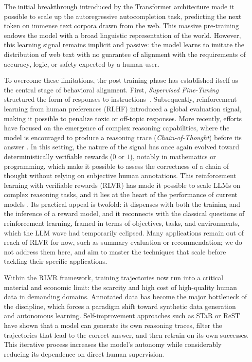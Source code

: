 \documentclass[11pt,a4paper]{article}
\begin{document}
The initial breakthrough introduced by the Transformer architecture \cite{vaswani2017attention} made it possible to scale up the autoregressive autocompletion task, predicting the next token on immense text corpora drawn from the web. This massive pre-training endows the model with a broad linguistic representation of the world. However, this learning signal remains implicit and passive: the model learns to imitate the distribution of web text with no guarantee of alignment with the requirements of accuracy, logic, or safety expected by a human user.

To overcome these limitations, the post-training phase has established itself as the central stage of behavioral alignment. First, \emph{Supervised Fine-Tuning} structured the form of responses to instructions~\cite{wei2022flan}. Subsequently, reinforcement learning from human preferences (RLHF) \cite{ouyang2022training} introduced a global evaluation signal, making it possible to penalize toxic or off-topic responses. More recently, efforts have focused on the emergence of complex reasoning capabilities, where the model is encouraged to produce a reasoning trace (\emph{Chain-of-Thought}) before its answer \cite{wei2022cot}. In this setting, the nature of the signal has once again evolved toward deterministically verifiable rewards ($0$ or $1$), notably in mathematics or programming, which make it possible to assess the correctness of a chain of thought without relying on subjective human annotations. This reinforcement learning with verifiable rewards (RLVR) has made it possible to scale LLMs on complex reasoning tasks, and it lies at the heart of the performance of current models \cite{openai_o1_2024, deepseekr1_2025}. Its practical appeal is twofold: it dispenses with both the training and the inference of a reward model, and it reconnects with the classical questions of reinforcement learning, framed in terms of objectives, tasks, and environments, which the LLM wave had temporarily eclipsed. Many applications remain out of reach of RLVR for now, such as summary evaluation or recommendation; we do not address them here, and aim to master the techniques that scale before tackling their specific applications.

Within the RLVR framework, training trajectories now run into a critical material and economic limit: the scarcity and high cost of high-quality human data in demanding domains. Annotated data has become the major bottleneck of the discipline, which forces a paradigm shift toward synthetic data generation and autonomous learning. Self-improvement approaches such as STaR \cite{zelikman2022star} or ReST \cite{singh2024beyond} have shown that a model can generate its own reasoning traces, filter the trajectories that lead to the correct answer, and then retrain on its own successes. This iterative process increases the model's autonomy while considerably reducing its dependence on direct human supervision.
\end{document}

